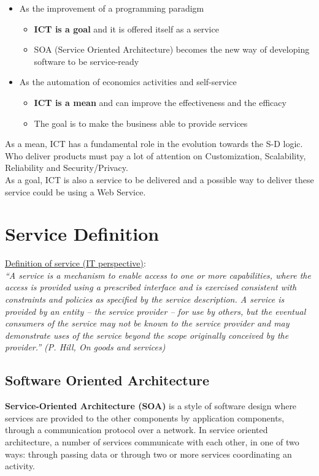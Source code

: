 \documentclass[10pt,a4paper]{article}
\begin{document}
\begin{itemize}
	\item As the improvement of a programming paradigm
	\begin{itemize}
		\item \textbf{ICT is a goal} and it is offered itself as a service
		\item SOA (Service Oriented Architecture) becomes the new way of developing software to be service-ready
		\end{itemize}
\item As the automation of economics activities and self-service
	\begin{itemize}
		\item \textbf{ICT is a mean} and can improve the effectiveness and the efficacy
		\item The goal is to make the business able to provide services
	\end{itemize}
\end{itemize}
As a mean, ICT has a fundamental role in the evolution towards the S-D logic. Who deliver products must pay a lot of attention on Customization, Scalability, Reliability and Security/Privacy. \\
As a goal, ICT is also a service to be delivered and a possible way to deliver these service could be using a Web Service.
\section{\LARGE Service Definition}
\uline{Definition of service (IT perspective)}: \\
\textit{“A service is a mechanism to enable access to one or more capabilities, where the access is provided using a prescribed interface and is exercised consistent with constraints and policies as specified by the service description. A service is provided by an entity – the service provider – for use by others, but the eventual consumers of the service may not be known to the service provider and may demonstrate uses of the service beyond the scope originally conceived by the provider.”  (P. Hill, On goods and services)}
\subsection{Software Oriented Architecture}
\textbf{Service-Oriented Architecture (SOA)} is a style of software design where services are provided to the other components by application components, through a communication protocol over a network. In service oriented architecture, a number of services communicate with each other, in one of two ways: through passing data or through two or more services coordinating an activity. \\
\end{document}
